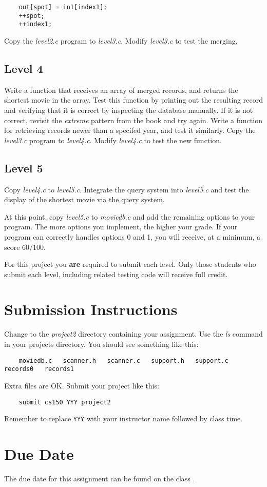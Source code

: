 \documentclass{article}
\begin{document}
\begin{verbatim}
    out[spot] = in1[index1];
    ++spot;
    ++index1;
\end{verbatim}

Copy the {\it level2.c} program to {\it level3.c}.
Modify {\it level3.c} to test the merging.

\subsection*{Level 4}
Write a function that receives an array of merged records, and returns the shortest movie in the array.  Test this function by printing out the
resulting record and verifying that it is correct by inspecting the database manually.  If it is not correct, revisit the {\it extreme} pattern
from the book and try again.  Write a function for retrieving records newer than a specifed year, and test it similarly.
Copy the {\it level3.c} program to {\it level4.c}.
Modify {\it level4.c} to test the new function.

\subsection*{Level 5}
Copy {\it level4.c} to {\it level5.c}.
Integrate the query system into {\it level5.c}
and test the display of the shortest
movie via the query system.

At this point, copy {\it level5.c} to {\it moviedb.c} and add the remaining options to your program. The more
options you implement, the higher your grade. If your program can correctly
handles options 0 and 1, you will receive, at a minimum, a score 60/100.

For this project you {\bf are} required to submit each level.  Only those students who submit each level, including
related testing code will receive full credit.

\section*{Submission Instructions}

Change to the {\it project2} directory containing your assignment.  Use the
{\it ls} command in your projects directory. You should see something like this:

\begin{verbatim}
    moviedb.c   scanner.h   scanner.c   support.h   support.c   records0   records1
\end{verbatim}

Extra files are OK. Submit your project like this:

\begin{verbatim}
    submit cs150 YYY project2
\end{verbatim}

Remember to replace {\tt YYY} with your instructor name followed by class
time.

\section*{Due Date}

The due date for this assignment can be found on the class
.
\end{document}
